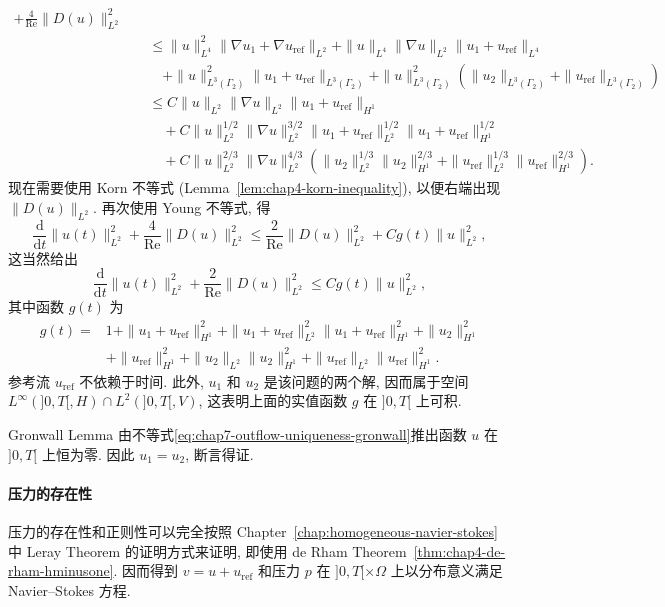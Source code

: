 \begin{sloppypar}
\[\begin{aligned}
 +\frac4{\operatorname{Re}}\|D(u)\|_{L^2}^2\\
 &\quad\leq\|u\|_{L^4}^2\|\nabla u_1+\nabla u_{\mathrm{ref}}\|_{L^2}
 +\|u\|_{L^4}\|\nabla u\|_{L^2}\|u_1+u_{\mathrm{ref}}\|_{L^4}\\
 &\qquad+\|u\|_{L^3(\Gamma_2)}^2\|u_1+u_{\mathrm{ref}}\|_{L^3(\Gamma_2)}
 +\|u\|_{L^3(\Gamma_2)}^2
 \left(\|u_2\|_{L^3(\Gamma_2)}+\|u_{\mathrm{ref}}\|_{L^3(\Gamma_2)}\right)\\
 &\quad\leq C\|u\|_{L^2}\|\nabla u\|_{L^2}\|u_1+u_{\mathrm{ref}}\|_{H^1}\\
 &\qquad+C\|u\|_{L^2}^{1/2}\|\nabla u\|_{L^2}^{3/2}
 \|u_1+u_{\mathrm{ref}}\|_{L^2}^{1/2}
 \|u_1+u_{\mathrm{ref}}\|_{H^1}^{1/2}\\
 &\qquad+C\|u\|_{L^2}^{2/3}\|\nabla u\|_{L^2}^{4/3}
 \left(\|u_2\|_{L^2}^{1/3}\|u_2\|_{H^1}^{2/3}
 +\|u_{\mathrm{ref}}\|_{L^2}^{1/3}\|u_{\mathrm{ref}}\|_{H^1}^{2/3}\right).
\end{aligned}
\]
现在需要使用 Korn 不等式 (Lemma~\ref{lem:chap4-korn-inequality}), 以便右端出现 $\|D(u)\|_{L^2}$. 再次使用 Young 不等式, 得
\[
 \frac{\mathrm d}{\mathrm dt}\|u(t)\|_{L^2}^2
 +\frac4{\operatorname{Re}}\|D(u)\|_{L^2}^2
 \leq\frac2{\operatorname{Re}}\|D(u)\|_{L^2}^2
 +Cg(t)\|u\|_{L^2}^2,
\]
这当然给出
\begin{equation}
 \frac{\mathrm d}{\mathrm dt}\|u(t)\|_{L^2}^2
 +\frac2{\operatorname{Re}}\|D(u)\|_{L^2}^2
 \leq Cg(t)\|u\|_{L^2}^2,
\label{eq:chap7-outflow-uniqueness-gronwall}
\end{equation}
其中函数 $g(t)$ 为
\[
\begin{aligned}
 g(t)={}&1+\|u_1+u_{\mathrm{ref}}\|_{H^1}^2
 +\|u_1+u_{\mathrm{ref}}\|_{L^2}^2
 \|u_1+u_{\mathrm{ref}}\|_{H^1}^2+\|u_2\|_{H^1}^2\\
 &+\|u_{\mathrm{ref}}\|_{H^1}^2
 +\|u_2\|_{L^2}\|u_2\|_{H^1}^2
 +\|u_{\mathrm{ref}}\|_{L^2}\|u_{\mathrm{ref}}\|_{H^1}^2.
\end{aligned}
\]
参考流 $u_{\mathrm{ref}}$ 不依赖于时间. 此外, $u_1$ 和 $u_2$ 是该问题的两个解, 因而属于空间 $L^\infty(]0,T[,H)\cap L^2(]0,T[,V)$, 这表明上面的实值函数 $g$ 在 $]0,T[$ 上可积.

Gronwall Lemma 由不等式\eqref{eq:chap7-outflow-uniqueness-gronwall}推出函数 $u$ 在 $]0,T[$ 上恒为零. 因此 $u_1=u_2$, 断言得证.

\paragraph{压力的存在性}
\label{subsec:chap7-outflow-pressure}

压力的存在性和正则性可以完全按照 Chapter~\ref{chap:homogeneous-navier-stokes} 中 Leray Theorem 的证明方式来证明, 即使用 de Rham Theorem~\ref{thm:chap4-de-rham-hminusone}. 因而得到 $v=u+u_{\mathrm{ref}}$ 和压力 $p$ 在 $]0,T[\times\Omega$ 上以分布意义满足 Navier--Stokes 方程.

\end{sloppypar}
